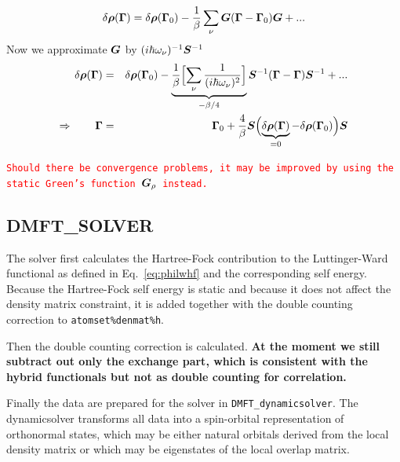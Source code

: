 \documentclass[11pt,a4paper]{report}
\newcommand{\petertt}[1]{\textcolor{red}{\texttt{#1}}}
\begin{document}
\begin{eqnarray}
\delta\bm{\rho}(\bm{\Gamma})=\delta\bm{\rho}(\bm{\Gamma}_0)
-\frac{1}{\beta}\sum_\nu \bm{G}(\bm{\Gamma}-\bm{\Gamma}_0)\bm{G}+...
\end{eqnarray}
Now we approximate $\bm{G}$ by $(i\hbar\omega_\nu)^{-1}\bm{S}^{-1}$
\begin{eqnarray}
\delta\bm{\rho}(\bm{\Gamma})&=&\delta\bm{\rho}(\bm{\Gamma}_0)
-
\underbrace{\frac{1}{\beta}
\Bigl[\sum_\nu\frac{1}{(i\hbar\omega_\nu)^2} \Bigr]}
_{-\beta/4}
\bm{S}^{-1}(\bm{\Gamma}-\bm{\Gamma})\bm{S}^{-1}+...
\nonumber\\
\Rightarrow\qquad\bm{\Gamma}&=&\bm{\Gamma}_0
+\frac{4}{\beta}
\bm{S}
\Bigl(\underbrace{\delta\bm{\rho}(\bm{\Gamma})}_{=0}-\delta\bm{\rho}(\bm{\Gamma}_0)\Bigr)
\bm{S}
\end{eqnarray}


\petertt{Should
  there be convergence problems, it may be improved by using the
  static Green's function $\bm{G}_\rho$ instead.}




\subsection{DMFT\_SOLVER}
The solver first calculates the Hartree-Fock contribution to the
Luttinger-Ward functional as defined in Eq.~\ref{eq:philwhf} and the
corresponding self energy. Because the Hartree-Fock self energy is
static and because it does not affect the density matrix constraint,
it is added together with the double counting correction to
\verb|atomset%denmat%h|.


Then the double counting correction is calculated. \textbf{At the
  moment we still subtract out only the exchange part, which is
  consistent with the hybrid functionals but not as double counting
  for correlation.}

Finally the data are prepared for the solver in
\verb|DMFT_dynamicsolver|. The dynamicsolver transforms all data into
a spin-orbital representation of orthonormal states, which may be
either natural orbitals derived from the local density matrix or which
may be eigenstates of the local overlap matrix.

\end{document}
